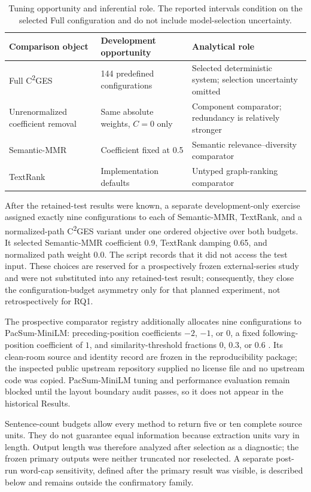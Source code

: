 \documentclass[applsci,article,submit,moreauthors]{Definitions/mdpi}
\newcommand{\cges}{C\textsuperscript{2}GES}
\begin{document}
\begin{table}[H]
\caption{Tuning opportunity and inferential role. The reported intervals condition on the selected Full configuration and do not include model-selection uncertainty.}
\label{tab:tuning-opportunity}\centering\small
\begin{tabular}{p{}p{}p{}}
\toprule
Comparison object & Development opportunity & Analytical role\\
\midrule
Full \cges{} & 144 predefined configurations & Selected deterministic system; selection uncertainty omitted\\
Unrenormalized coefficient removal & Same absolute weights, $C=0$ only & Component comparator; redundancy is relatively stronger\\
Semantic-MMR & Coefficient fixed at 0.5 & Semantic relevance--diversity comparator\\
TextRank & Implementation defaults & Untyped graph-ranking comparator\\
\bottomrule
\end{tabular}
\end{table}

After the retained-test results were known, a separate development-only exercise assigned exactly nine configurations to each of Semantic-MMR, TextRank, and a normalized-path \cges{} variant under one ordered objective over both budgets. It selected Semantic-MMR coefficient 0.9, TextRank damping 0.65, and normalized path weight 0.0. The script records that it did not access the test input. These choices are reserved for a prospectively frozen external-series study and were not substituted into any retained-test result; consequently, they close the configuration-budget asymmetry only for that planned experiment, not retrospectively for RQ1.

The prospective comparator registry additionally allocates nine configurations to PacSum-MiniLM: preceding-position coefficients $-2$, $-1$, or $0$, a fixed following-position coefficient of $1$, and similarity-threshold fractions $0$, $0.3$, or $0.6$ \cite{zheng2019pacsum}. Its clean-room source and identity record are frozen in the reproducibility package; the inspected public upstream repository supplied no license file and no upstream code was copied. PacSum-MiniLM tuning and performance evaluation remain blocked until the layout boundary audit passes, so it does not appear in the historical Results.

Sentence-count budgets allow every method to return five or ten complete source units. They do not guarantee equal information because extraction units vary in length. Output length was therefore analyzed after selection as a diagnostic; the frozen primary outputs were neither truncated nor reselected. A separate post-run word-cap sensitivity, defined after the primary result was visible, is described below and remains outside the confirmatory family.
\end{document}
